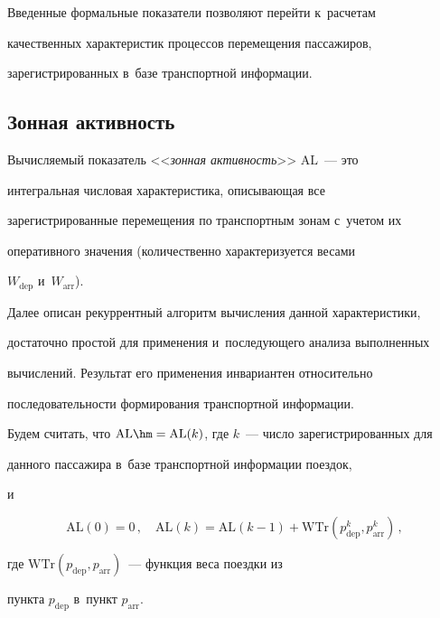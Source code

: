 Введенные формальные показатели позволяют перейти к~расчетам 


качественных характеристик процессов перемещения пассажиров, 


зарегистрированных в~базе транспортной информации.





\subsection{Зонная активность} %





Вычисляемый показатель <<\textit{зонная активность}>> $\mathrm{AL}$~--- это 


интегральная чис\-ло\-вая характеристика, опи\-сы\-ва\-ющая все 


зарегистрированные перемещения по транспортным зонам с~учетом их 


оперативного значения (количественно характеризуется весами 


$W_{\mathrm{dep}}$ и~$W_{\mathrm{arr}}$).





Далее описан рекуррентный алгоритм вы\-чис\-ле\-ния данной характеристики, 


достаточно прос\-той для применения и~по\-сле\-ду\-юще\-го анализа выполненных 


вы\-чис\-ле\-ний. Результат его применения инвариантен относительно 


последовательности формирования транспортной информации.





Будем считать, что $\mathrm{AL}\hm = \mathrm{AL}(k)$, где $k$~--- чис\-ло зарегистрированных для 


данного пассажира в~базе транспортной информации поездок, 


и


$$


\mathrm{AL}(0) = 0\,, \quad \mathrm{AL}(k) = \mathrm{AL}(k-1) + \mathrm{WTr}(p^k_{\mathrm{dep}}, 


p^k_{\mathrm{arr}})\,,


$$


где $\mathrm{WTr}(p_{\mathrm{dep}}, p_{\mathrm{arr}})$~--- функция веса поездки из 


пункта $p_{\mathrm{dep}}$ в~пункт $p_{\mathrm{arr}}$.





